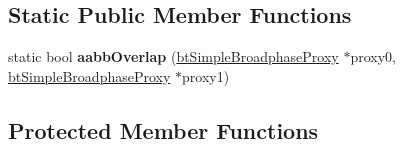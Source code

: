 \subsection*{Static Public Member Functions}
\begin{DoxyCompactItemize}
\item 
\hypertarget{classbt_simple_broadphase_ade60a3d0ed52b7b4ec41a25d697357fb}{static bool {\bfseries aabb\+Overlap} (\hyperlink{structbt_simple_broadphase_proxy}{bt\+Simple\+Broadphase\+Proxy} $\ast$proxy0, \hyperlink{structbt_simple_broadphase_proxy}{bt\+Simple\+Broadphase\+Proxy} $\ast$proxy1)}\label{classbt_simple_broadphase_ade60a3d0ed52b7b4ec41a25d697357fb}

\end{DoxyCompactItemize}
\subsection*{Protected Member Functions}
